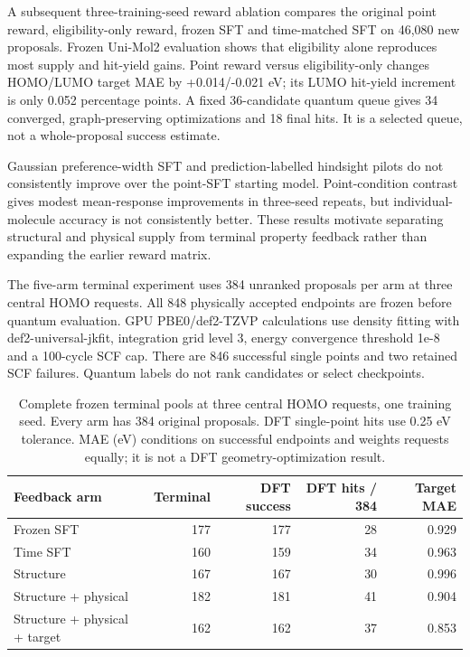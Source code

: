 \documentclass[11pt,a4paper]{article}
\begin{document}
A subsequent three-training-seed reward ablation compares the original
point reward, eligibility-only reward, frozen SFT and time-matched SFT
on 46,080 new proposals. Frozen Uni-Mol2 evaluation shows that
eligibility alone reproduces most supply and hit-yield gains. Point
reward versus eligibility-only changes HOMO/LUMO target MAE by
+0.014/-0.021 eV; its LUMO hit-yield increment is only 0.052 percentage
points. A fixed 36-candidate quantum queue gives 34 converged,
graph-preserving optimizations and 18 final hits. It is a selected
queue, not a whole-proposal success estimate.

Gaussian preference-width SFT and prediction-labelled hindsight pilots
do not consistently improve over the point-SFT starting model.
Point-condition contrast gives modest mean-response improvements in
three-seed repeats, but individual-molecule accuracy is not consistently
better. These results motivate separating structural and physical supply
from terminal property feedback rather than expanding the earlier reward
matrix.

The five-arm terminal experiment uses 384 unranked proposals per arm at
three central HOMO requests. All 848 physically accepted endpoints are
frozen before quantum evaluation. GPU PBE0/def2-TZVP calculations use
density fitting with def2-universal-jkfit, integration grid level 3,
energy convergence threshold 1e-8 and a 100-cycle SCF cap. There are 846
successful single points and two retained SCF failures. Quantum labels
do not rank candidates or select checkpoints.

\begin{table}[!htbp]
\centering
\caption{Complete frozen terminal pools at three central HOMO requests,
one training seed. Every arm has 384 original proposals. DFT
single-point hits use 0.25 eV tolerance. MAE (eV) conditions on
successful endpoints and weights requests equally; it is not a DFT
geometry-optimization result. }
\begin{tabular}{@{}lrrrr@{}}

\toprule\noalign{}
Feedback arm & Terminal & DFT success & DFT hits / 384 & Target MAE \\
\midrule\noalign{}

Frozen SFT & 177 & 177 & 28 & 0.929 \\
Time SFT & 160 & 159 & 34 & 0.963 \\
Structure & 167 & 167 & 30 & 0.996 \\
Structure + physical & 182 & 181 & 41 & 0.904 \\
Structure + physical + target & 162 & 162 & 37 & 0.853 \\
\bottomrule
\end{tabular}
\end{table}
\end{document}
